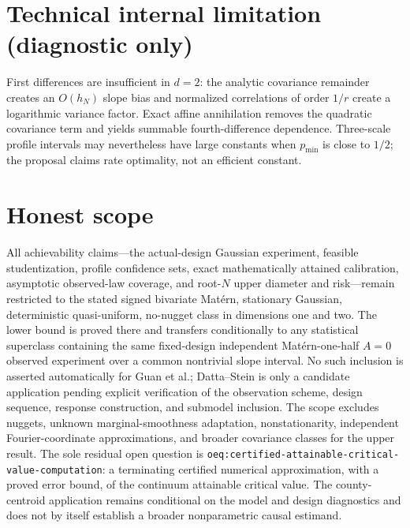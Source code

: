 \documentclass{article}
\begin{document}
\section*{Technical internal limitation (diagnostic only)}

First differences are insufficient in \(d=2\): the analytic covariance remainder creates an \(O(h_N)\) slope bias and normalized correlations of order \(1/r\) create a logarithmic variance factor. Exact affine annihilation removes the quadratic covariance term and yields summable fourth-difference dependence. Three-scale profile intervals may nevertheless have large constants when \(p_{\min}\) is close to \(1/2\); the proposal claims rate optimality, not an efficient constant.

\section{Honest scope}

All achievability claims---the actual-design Gaussian experiment, feasible studentization, profile confidence sets, exact mathematically attained calibration, asymptotic observed-law coverage, and root-\(N\) upper diameter and risk---remain restricted to the stated signed bivariate Mat\'ern, stationary Gaussian, deterministic quasi-uniform, no-nugget class in dimensions one and two. The lower bound is proved there and transfers conditionally to any statistical superclass containing the same fixed-design independent Mat\'ern-one-half \(A=0\) observed experiment over a common nontrivial slope interval. No such inclusion is asserted automatically for Guan et al.; Datta--Stein is only a candidate application pending explicit verification of the observation scheme, design sequence, response construction, and submodel inclusion. The scope excludes nuggets, unknown marginal-smoothness adaptation, nonstationarity, independent Fourier-coordinate approximations, and broader covariance classes for the upper result. The sole residual open question is \texttt{oeq:certified-attainable-critical-value-computation}: a terminating certified numerical approximation, with a proved error bound, of the continuum attainable critical value. The county-centroid application remains conditional on the model and design diagnostics and does not by itself establish a broader nonparametric causal estimand.
\end{document}
